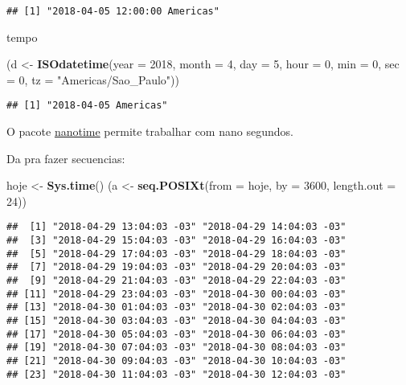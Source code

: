 \documentclass[]{book}
\newenvironment{Shaded}{\begin{snugshade}}{\end{snugshade}}
\newcommand{\KeywordTok}[1]{\textcolor[rgb]{0.13,0.29,0.53}{\textbf{#1}}}
\newcommand{\DataTypeTok}[1]{\textcolor[rgb]{0.13,0.29,0.53}{#1}}
\newcommand{\DecValTok}[1]{\textcolor[rgb]{0.00,0.00,0.81}{#1}}
\newcommand{\StringTok}[1]{\textcolor[rgb]{0.31,0.60,0.02}{#1}}
\newcommand{\NormalTok}[1]{#1}
\theoremstyle{definition}
\theoremstyle{definition}
\theoremstyle{definition}
\theoremstyle{remark}
\begin{document}
\begin{verbatim}
## [1] "2018-04-05 12:00:00 Americas"
\end{verbatim}

tempo

\begin{Shaded}
\begin{Highlighting}[]
\NormalTok{(d <-}\StringTok{ }\KeywordTok{ISOdatetime}\NormalTok{(}\DataTypeTok{year =} \DecValTok{2018}\NormalTok{, }\DataTypeTok{month =} \DecValTok{4}\NormalTok{, }\DataTypeTok{day =} \DecValTok{5}\NormalTok{, }\DataTypeTok{hour =} \DecValTok{0}\NormalTok{, }\DataTypeTok{min =} \DecValTok{0}\NormalTok{, }\DataTypeTok{sec =} \DecValTok{0}\NormalTok{,}
                  \DataTypeTok{tz =} \StringTok{"Americas/Sao_Paulo"}\NormalTok{))}
\end{Highlighting}
\end{Shaded}

\begin{verbatim}
## [1] "2018-04-05 Americas"
\end{verbatim}

O pacote \href{https://github.com/eddelbuettel/nanotime}{nanotime}
permite trabalhar com nano segundos.

Da pra fazer secuencias:

\begin{Shaded}
\begin{Highlighting}[]
\NormalTok{hoje <-}\StringTok{ }\KeywordTok{Sys.time}\NormalTok{()}
\NormalTok{(a <-}\StringTok{ }\KeywordTok{seq.POSIXt}\NormalTok{(}\DataTypeTok{from =}\NormalTok{ hoje, }\DataTypeTok{by =} \DecValTok{3600}\NormalTok{, }\DataTypeTok{length.out =} \DecValTok{24}\NormalTok{))}
\end{Highlighting}
\end{Shaded}

\begin{verbatim}
##  [1] "2018-04-29 13:04:03 -03" "2018-04-29 14:04:03 -03"
##  [3] "2018-04-29 15:04:03 -03" "2018-04-29 16:04:03 -03"
##  [5] "2018-04-29 17:04:03 -03" "2018-04-29 18:04:03 -03"
##  [7] "2018-04-29 19:04:03 -03" "2018-04-29 20:04:03 -03"
##  [9] "2018-04-29 21:04:03 -03" "2018-04-29 22:04:03 -03"
## [11] "2018-04-29 23:04:03 -03" "2018-04-30 00:04:03 -03"
## [13] "2018-04-30 01:04:03 -03" "2018-04-30 02:04:03 -03"
## [15] "2018-04-30 03:04:03 -03" "2018-04-30 04:04:03 -03"
## [17] "2018-04-30 05:04:03 -03" "2018-04-30 06:04:03 -03"
## [19] "2018-04-30 07:04:03 -03" "2018-04-30 08:04:03 -03"
## [21] "2018-04-30 09:04:03 -03" "2018-04-30 10:04:03 -03"
## [23] "2018-04-30 11:04:03 -03" "2018-04-30 12:04:03 -03"
\end{verbatim}
\end{document}
